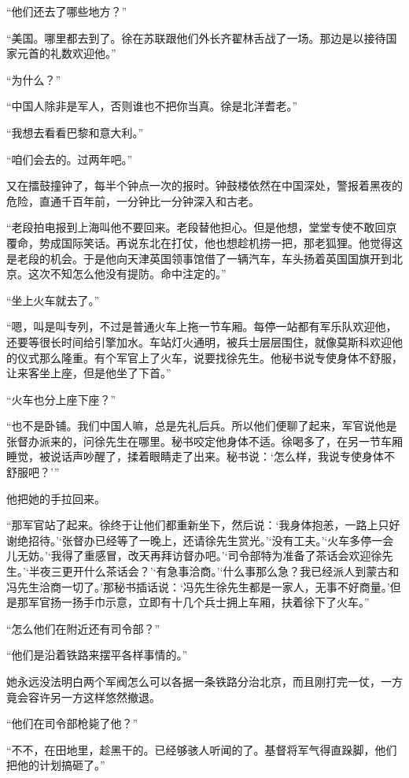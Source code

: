 \par “他们还去了哪些地方？”
\par “美国。哪里都去到了。徐在苏联跟他们外长齐翟林舌战了一场。那边是以接待国家元首的礼数欢迎他。”
\par “为什么？”
\par “中国人除非是军人，否则谁也不把你当真。徐是北洋耆老。”
\par “我想去看看巴黎和意大利。”
\par “咱们会去的。过两年吧。”
\par 又在擂鼓撞钟了，每半个钟点一次的报时。钟鼓楼依然在中国深处，警报着黑夜的危险，直通千百年前，一分钟比一分钟深入和古老。
\par “老段拍电报到上海叫他不要回来。老段替他担心。但是他想，堂堂专使不敢回京覆命，势成国际笑话。再说东北在打仗，他也想趁机捞一把，那老狐狸。他觉得这是老段的机会。于是他向天津英国领事馆借了一辆汽车，车头扬着英国国旗开到北京。这次不知怎么他没有提防。命中注定的。”
\par “坐上火车就去了。”
\par “嗯，叫是叫专列，不过是普通火车上拖一节车厢。每停一站都有军乐队欢迎他，还要等很长时间给引擎加水。车站灯火通明，被兵士层层围住，就像莫斯科欢迎他的仪式那么隆重。有个军官上了火车，说要找徐先生。他秘书说专使身体不舒服，让来客坐上座，但是他坐了下首。”
\par “火车也分上座下座？”
\par “也不是卧铺。我们中国人嘛，总是先礼后兵。所以他们便聊了起来，军官说他是张督办派来的，问徐先生在哪里。秘书咬定他身体不适。徐喝多了，在另一节车厢睡觉，被说话声吵醒了，揉着眼睛走了出来。秘书说：‘怎么样，我说专使身体不舒服吧？’”
\par 他把她的手拉回来。
\par “那军官站了起来。徐终于让他们都重新坐下，然后说：‘我身体抱恙，一路上只好谢绝招待。’‘张督办已经等了一晚上，还请徐先生赏光。’‘没有工夫。’‘火车多停一会儿无妨。’‘我得了重感冒，改天再拜访督办吧。’‘司令部特为准备了茶话会欢迎徐先生。’‘半夜三更开什么茶话会？’‘有急事洽商。’‘什么事那么急？我已经派人到蒙古和冯先生洽商一切了。’那秘书插话说：‘冯先生徐先生都是一家人，无事不好商量。’但是那军官扬一扬手巾示意，立即有十几个兵士拥上车厢，扶着徐下了火车。”
\par “怎么他们在附近还有司令部？”
\par “他们是沿着铁路来摆平各样事情的。”
\par 她永远没法明白两个军阀怎么可以各据一条铁路分治北京，而且刚打完一仗，一方竟会容许另一方这样悠然撤退。
\par “他们在司令部枪毙了他？”
\par “不不，在田地里，趁黑干的。已经够骇人听闻的了。基督将军气得直跺脚，他们把他的计划搞砸了。”
